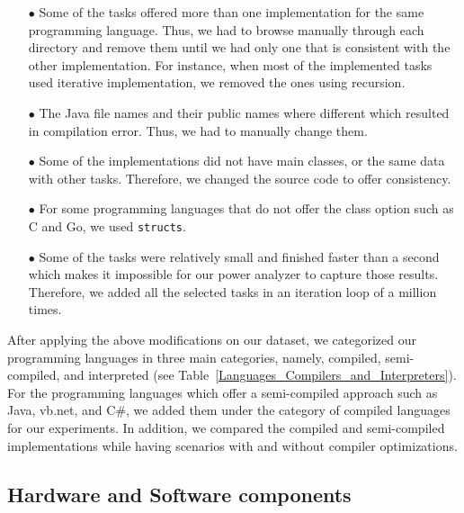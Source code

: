 \begin{enumerate}
	\item [$\bullet$] Some of the tasks offered more than one implementation 
	for the same programming language. 
	Thus, we had to browse manually through each directory and remove 
	them until we had only one that is consistent with the other 
	implementation. 
	For instance, when most of the implemented tasks used iterative implementation, 
	we removed the ones using recursion. 
	\item [$\bullet$] The Java file names and their public names where different 
	which resulted in compilation error. 
	Thus, we had to manually change them.
	\item [$\bullet$] Some of the implementations did not have main 
	classes, or the same data with other tasks. 
	Therefore, we changed the source code to offer consistency.
	\item [$\bullet$] For some programming languages that do not offer 
	the class option such as C and Go, we used {\tt structs}. 
	\item [$\bullet$] Some of the tasks were relatively small and 
	finished faster than a second which makes it impossible for our 
	power analyzer to capture those results. 
	Therefore, we added all the selected tasks in an iteration loop of 
	a million times. 
\end{enumerate}

After applying the above modifications on our dataset, we categorized our 
programming languages in three main categories, namely, compiled, 
semi-compiled, and interpreted (see Table~\ref{Languages_Compilers_and_Interpreters}). 
For the programming languages which offer a semi-compiled approach 
such as Java, {\sc vb.net}, and C\#, we added them under the category of 
compiled languages for our experiments. 
In addition, we compared the compiled and semi-compiled implementations while 
having scenarios with and without compiler optimizations.


\subsection{Hardware and Software components}

